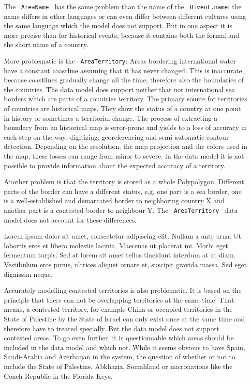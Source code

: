 The ~\texttt{AreaName}~ has the same problem than the name of the ~\texttt{Hivent.name}: the name differs in other languages or can even differ between different cultures using the same language which the model does not support. But in one aspect it is more precise than for historical events, because it contains both the formal and the short name of a country.

More problematic is the ~\texttt{AreaTerritory}: Areas bordering international water have a constant coastline assuming that it has never changed. This is inaccurate, because coastlines gradually change all the time, therefore also the boundaries of the countries. The data model does support neither that nor international sea borders which are parts of a countries territory. The primary source for territories of countries are historical maps. They show the status of a country at one point in history or sometimes a territorial change. The process of extracting a boundary from an historical map is error-prone and yields to a loss of accuracy in each step on the way: digitizing, georeferencing and semi-automatic contour detection. Depending on the resolution, the map projection and the colors used in the map, these losses can range from minor to severe. In the data model it is not possible to provide information about the expected accuracy of a territory.

Another problem is that the territory is stored as a whole Polypolygon. Different parts of the border can have a different status, e.g. one part is a sea border, one is a well-established and demarcated border to neighboring country X and another part is a contested border to neighbour Y. The ~\texttt{AreaTerritory}~ data model does not account for these differences.

Lorem ipsum dolor sit amet, consectetur adipiscing elit. Nullam a ante urna. Ut lobortis eros et libero molestie lacinia. Maecenas ut placerat mi. Morbi eget fermentum turpis. Sed at lorem sit amet tellus tincidunt interdum at at diam. Vestibulum eros purus, ultrices aliquet ornare et, suscipit gravida massa. Sed eget dignissim neque.

Accurately modelling contested territories is also problematic. It is based on the principle that there can not be overlapping territories at the same time. That means, a contested territory, for example China or occupied territories in the State of Palestine by the State of Israel can only exist once at the same time and therefore have to treated specially. But the data model does not support contested areas. To go even further, it is questionnable which areas should be included in the data model and which not. While it seems obvious to have Spain, Saudi-Arabia and Azerbaijan in the system, the question of whether or not to include the State of Palestine, Abkhazia, Somaliland or micronations like the Conch Republic in the Florida Keys.

